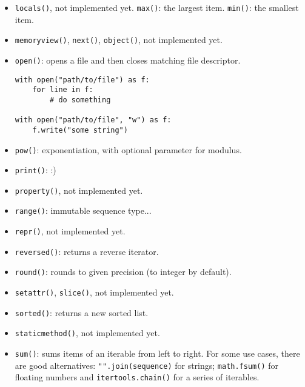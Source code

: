 \begin{itemize}
\item
\texttt{locals()},
\dotfill not implemented yet.
\texttt{max()}: the largest item.
\texttt{min()}: the smallest item.

\item
\texttt{memoryview()},
\texttt{next()},
\texttt{object()},
\dotfill not implemented yet.

\item \texttt{open()}: opens a file and then closes matching file descriptor.
\begin{verbatim}
with open("path/to/file") as f:
	for line in f:
		# do something

with open("path/to/file", "w") as f:
	f.write("some string")
\end{verbatim}

\item \texttt{pow()}: exponentiation, with optional parameter for modulus.

\item \texttt{print()}: :)

\item
\texttt{property()},
\dotfill not implemented yet.

\item \texttt{range()}: immutable sequence type...

\item
\texttt{repr()},
\dotfill not implemented yet.

\item \texttt{reversed()}: returns a reverse iterator.

\item \texttt{round()}: rounds to given precision (to integer by default).

\item
\texttt{setattr()},
\texttt{slice()},
\dotfill not implemented yet.

\item \texttt{sorted()}: returns a new sorted list.

\item
\texttt{staticmethod()},
\dotfill not implemented yet.

\item \texttt{sum()}: sums items of an iterable from left to right.
For some use cases, there are good alternatives: \texttt{"".join(sequence)} for strings; \texttt{math.fsum()} for floating numbers and \texttt{itertools.chain()} for a series of iterables.


\end{itemize}
